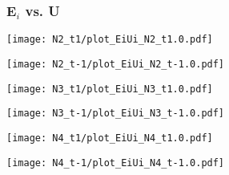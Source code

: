 \documentclass{beamer}
\begin{document}
\begin{frame}\frametitle{E$_i$ vs. U}
	\begin{center}
		\begin{minipage}[t]{0.44\textwidth}
			\texttt{[image: N2\_t1/plot\_EiUi\_N2\_t1.0.pdf]}
		\end{minipage}
		\begin{minipage}[t]{0.44\textwidth}
			\texttt{[image: N2\_t-1/plot\_EiUi\_N2\_t-1.0.pdf]}
		\end{minipage}
		
		\begin{minipage}[t]{0.44\textwidth}
			\texttt{[image: N3\_t1/plot\_EiUi\_N3\_t1.0.pdf]}
		\end{minipage}
		\begin{minipage}[t]{0.44\textwidth}
			\texttt{[image: N3\_t-1/plot\_EiUi\_N3\_t-1.0.pdf]}
		\end{minipage}
		
		\begin{minipage}[t]{0.44\textwidth}
			\texttt{[image: N4\_t1/plot\_EiUi\_N4\_t1.0.pdf]}
		\end{minipage}
		\begin{minipage}[t]{0.44\textwidth}
			\texttt{[image: N4\_t-1/plot\_EiUi\_N4\_t-1.0.pdf]}
		\end{minipage}
	\end{center}	
\end{frame}

\end{document}
